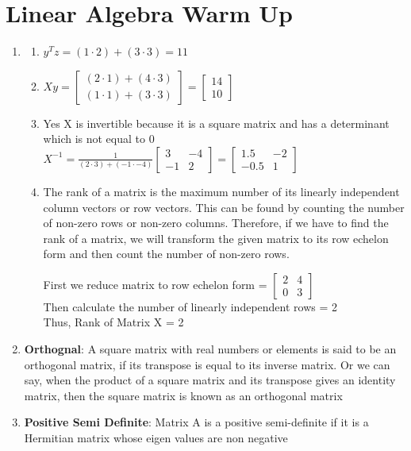\documentclass[12pt,letterpaper]{article}
\begin{document}
\section*{Linear Algebra Warm Up}
    \begin{enumerate}
            \item
            \begin{enumerate}
                \item $y^T z = (1\cdot2) + (3\cdot3) = 11$
                \item $Xy = \begin{bmatrix}(2\cdot1) + (4\cdot3) \\(1\cdot1) + (3\cdot3)\end{bmatrix} = \begin{bmatrix}14 \\ 10 \end{bmatrix}$
                \item 
                Yes X is invertible because it is a square matrix and has a determinant which is not equal to 0 \\
                $X^{-1} =  \frac{1}{(2\cdot3) + (-1\cdot-4)}  \begin{bmatrix}3 & -4 \\ -1 & 2 \end{bmatrix} =  \begin{bmatrix}1.5 & -2 \\ -0.5 & 1 \end{bmatrix}$
                \item
                The rank of a matrix is the maximum number of its linearly independent column vectors or row vectors. This can be found by counting the number of non-zero rows or non-zero columns. Therefore, if we have to find the rank of a matrix, we will transform the given matrix to its row echelon form and then count the number of non-zero rows.
                
                First we reduce matrix to row echelon form = $\begin{bmatrix}2 & 4 \\ 0 & 3 \end{bmatrix}$ \\
                Then calculate the number of linearly independent rows = 2 
                \\
                Thus, Rank of Matrix X = 2
            \end{enumerate}
            \item
            \textbf{Orthognal}: A square matrix with real numbers or elements is said to be an orthogonal matrix, if its transpose is equal to its inverse matrix. Or we can say, when the product of a square matrix and its transpose gives an identity matrix, then the square matrix is known as an orthogonal matrix
            \item
            \textbf{Positive Semi Definite}: Matrix A is a positive semi-definite if it is a Hermitian matrix whose eigen values are non negative
            

\end{enumerate}
\end{document}
